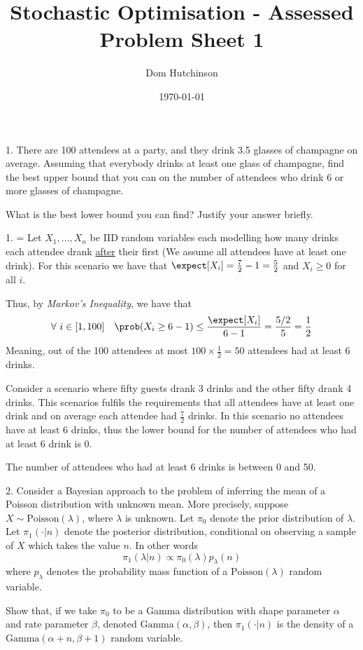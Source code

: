 \documentclass[11pt,a4paper]{article}
\begin{document}
\questionsfalse

\title{Stochastic Optimisation - Assessed Problem Sheet 1}
\author{Dom Hutchinson}
\date{\today}
\maketitle


\begin{question}{1.}
  There are 100 attendees at a party, and they drink 3.5 glasses of champagne on average. Assuming that everybody drinks at least one glass of champagne, find the best upper bound that you can on the number of attendees who drink 6 or more glasses of champagne.
  \par What is the best lower bound you can find? Justify your answer briefly.
\end{question}

\begin{answer}{1.}
  \everymath={}
  Let $X_1,\dots,X_n$ be IID random variables each modelling how many drinks each attendee drank \underline{after} their first (We assume all attendees have at least one drink). For this scenario we have that $\expect[X_i]=\frac72-1=\frac52$ and $X_i\geq0$ for all $i$.
  \par Thus, by \textit{Markov's Inequality}, we have that
  \[ \forall\ i\in[1,100]\quad\prob(X_i\geq6-1)\leq\frac{\expect[X_i]}{6-1}=\frac{5/2}5=\frac12 \]
  Meaning, out of the 100 attendees at most $100\times\frac12=50$ attendees had at least 6 drinks.

  \par Consider a scenario where fifty guests drank 3 drinks and the other fifty drank 4 drinks. This scenarios fulfils the requirements that all attendees have at least one drink and on average each attendee had $\frac72$ drinks. In this scenario no attendees have at least 6 drinks, thus the lower bound for the number of attendees who had at least 6 drink is 0.
  \par The number of attendees who had at least 6 drinks is between 0 and 50.
\end{answer}

\begin{question}{2.}
  Consider a Bayesian approach to the problem of inferring the mean of a Poisson distribution with unknown mean. More precisely, suppose $X\sim\text{Poisson}(\lambda)$, where $\lambda$ is unknown. Let $\pi_0$ denote the prior distribution of $\lambda$. Let $\pi_1(\cdot|n)$ denote the posterior distribution, conditional on observing a sample of $X$ which takes the value $n$. In other words
  \[ \pi_1(\lambda|n)\propto \pi_0(\lambda)p_\lambda(n) \]
  where $p_\lambda$ denotes the probability mass function of a $\text{Poisson}(\lambda)$ random variable.
  \par Show that, if we take $\pi_0$ to be a Gamma distribution with shape parameter $\alpha$ and rate parameter $\beta$, denoted $\text{Gamma}(\alpha,\beta)$, then $\pi_1(\cdot|n)$ is the density of a $\text{Gamma}(\alpha+n,\beta+1)$ random variable.
\end{question}
\end{document}

